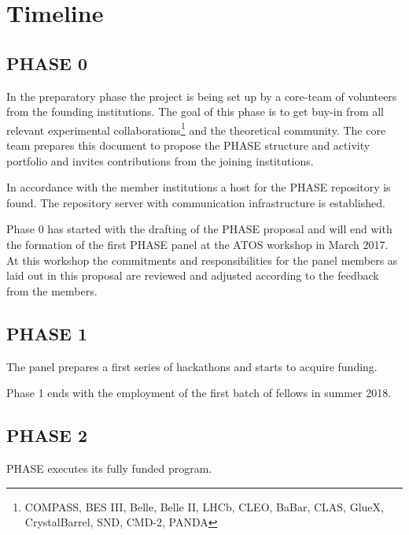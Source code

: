 \section{Timeline}

\subsection{PHASE 0}
In the preparatory phase the project is being set up by a core-team of volunteers from the founding institutions. The goal of this phase is to get buy-in from all relevant
experimental collaborations\footnote{COMPASS, BES III, Belle, Belle II, LHCb, CLEO, BaBar, CLAS, GlueX, CrystalBarrel, SND, CMD-2, PANDA} and the theoretical community.  The core team prepares this document to propose the PHASE structure and activity portfolio and invites contributions from the joining institutions.

In accordance with the member institutions a host for the PHASE repository is found. The repository server with communication infrastructure is established.

Phase 0 has started with the drafting of the PHASE proposal and will end with the formation of the first PHASE panel at the ATOS workshop in March 2017. At this workshop the commitments and responsibilities for the panel members as laid out in this proposal are reviewed and adjusted according to the feedback from the members.

\subsection{PHASE 1}
The panel prepares a first series of hackathons and starts to acquire funding.

Phase 1 ends with the employment of the first batch of fellows in summer 2018.
\subsection{PHASE 2}
PHASE executes its fully funded program.